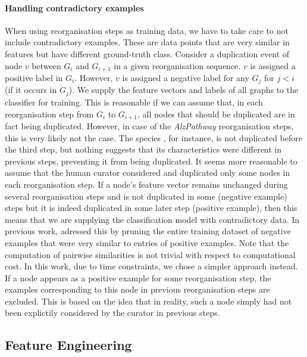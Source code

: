 \documentclass[
	fontsize=10pt, %
	twoside=true, %
	secnumdepth=1, %
  toc=indentunnumbered %
]{kaobook}
\begin{document}
\paragraph{Handling contradictory examples} When using reorganisation steps as
training data, we have to take care to not include contradictory examples. These
are data points that are very similar in features but have different
ground-truth class. Consider a duplication event of node $v$ between $G_i$ and
$G_{i+1}$ in a given reorganisation sequence. $v$ is assigned a positive label
in $G_i$. However, $v$ is assigned a negative label for any $G_j$ for $j<i$ (if
it occurs in $G_j$). We supply the feature vectors and labels of all graphs to
the classifier for training. This is reasonable if we can assume that, in each
reorganisation step from $G_i$ to $G_{i+1}$, all nodes that should be duplicated
are in fact being duplicated.
%
However, in case of the \textit{AlzPathway} reorganisation steps, this is very
likely not the case. The species , for instance, is not duplicated
before the third step, but nothing suggests that its characteristics were
different in previous steps, preventing it from being duplicated. It seems more
reasonable to assume that the human curator considered and duplicated only some
nodes in each reorganisation step.
%
If a node's feature vector remains unchanged during several reorganisation steps
and is not duplicated in some (negative example) steps but it is indeed
duplicated in some later step (positive example), then this means that we are
supplying the classification model with contradictory data. In previous work,
\nielsen{} adressed this by pruning the entire training dataset of negative
examples that were very similar to entries of positive examples. Note that the
computation of pairwise similarities is not trivial with respect to
computational cost. In this work, due to time constraints, we chose a simpler
approach instead. If a node appears as a positive example for some
reorganisation step, the examples corresponding to this node in previous
reorganisation steps are excluded. This is based on the idea that in reality,
such a node simply had not been explictily considered by the curator in previous
steps. 





\subsection{Feature Engineering}
\label{sec:feature-engineering}
\end{document}
